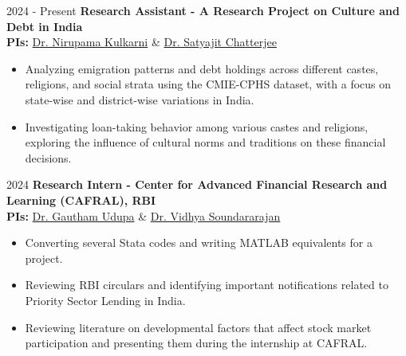\datedsubsection{ }
	{%
		2024 - Present}
	{%
		\textbf{Research Assistant - A Research Project on Culture and Debt in India}
    } \\
    \textbf{PIs:} \href{https://www.nirupamakulkarni.com}{Dr. Nirupama Kulkarni} \& \href{https://sites.google.com/site/chatterjeesatyajit/home}{Dr. Satyajit Chatterjee} 
    {%
    \begin{itemize}
        \item Analyzing emigration patterns and debt holdings across different castes, religions, and social strata using the CMIE-CPHS dataset, with a focus on state-wise and district-wise variations in India.
        \item Investigating loan-taking behavior among various castes and religions, exploring the influence of cultural norms and traditions on these financial decisions.  
    \end{itemize}
  }

\vspace{-0.8em} %

\datedsubsection{ }
	{%
		2024}
	{%
		\textbf{Research Intern - Center for Advanced Financial Research and Learning (CAFRAL), RBI}
    } \\
    \textbf{PIs:} \href{https://sites.google.com/view/gauthamudupa/home/}{Dr. Gautham Udupa} \& \href{https://www.vidhyasrajan.com}{Dr. Vidhya Soundararajan} 
	{%
    \begin{itemize}
        \item Converting several Stata codes and writing MATLAB equivalents for a project.
        \item Reviewing RBI circulars and identifying important notifications related to Priority Sector Lending in India.  
        \item Reviewing literature on developmental factors that affect stock market participation and presenting them during the internship at CAFRAL. 
    \end{itemize}
  }
